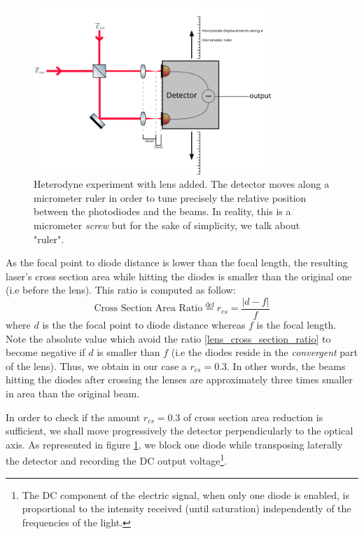 \documentclass[11pt]{report}
\begin{document}
\begin{figure}[h!]
\centering
\includegraphics[width=0.8\textwidth]{heterodyne-lens}
\caption{Heterodyne experiment with lens added. The detector moves along a micrometer ruler in order to tune precisely the relative position between the photodiodes and the beams. In reality, this is a micrometer \textit{screw} but for the sake of simplicity, we talk about "ruler".}
\label{fig:heterodyne-lens}
\end{figure}

As the focal point to diode distance is lower than the focal length, the resulting laser's cross section area while hitting the diodes is smaller than the original one (i.e before the lens). This ratio is computed as follow:
\begin{equation}
\label{lens_cross_section_ratio}
\textrm{Cross Section Area Ratio} \stackrel{\text{def}}{=} r_{cs} = \frac{\vert d-f \vert}{f}
\end{equation}
where $d$ is the the focal point to diode distance whereas $f$ is the focal length. Note the absolute value which avoid the ratio \eqref{lens_cross_section_ratio} to become negative if $d$ is smaller than $f$ (i.e the diodes reside in the \textit{convergent} part of the lens). Thus, we obtain in our case a $r_{cs} = 0.3$. In other words, the beams hitting the diodes after crossing the lenses are approximately three times smaller in area than the original beam.

In order to check if the amount $r_{cs} = 0.3$ of cross section area reduction is sufficient, we shall move progressively the detector perpendicularly to the optical axis. As represented in figure \ref{fig:heterodyne-lens}, we block one diode while transposing laterally the detector and recording the DC output voltage\footnote{The DC component of the electric signal, when only one diode is enabled, is proportional to the intensity received (until saturation) independently of the frequencies of the light. }.
\end{document}
